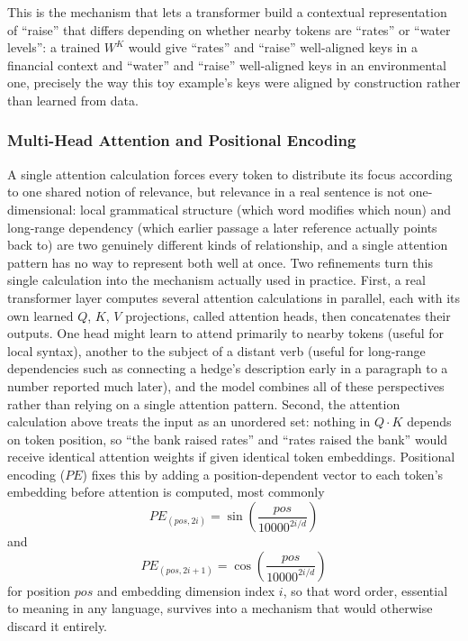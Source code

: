 \documentclass[../ai_in_finance]{subfiles}
\begin{document}
This is the mechanism that lets a transformer build a contextual representation of ``raise'' that differs depending on whether nearby tokens are ``rates'' or ``water levels'': a trained $W^K$ would give ``rates'' and ``raise'' well-aligned keys in a financial context and ``water'' and ``raise'' well-aligned keys in an environmental one, precisely the way this toy example's keys were aligned by construction rather than learned from data.

\subsubsection*{Multi-Head Attention and Positional Encoding}

A single attention calculation forces every token to distribute its focus according to one shared notion of relevance, but relevance in a real sentence is not one-dimensional: local grammatical structure (which word modifies which noun) and long-range dependency (which earlier passage a later reference actually points back to) are two genuinely different kinds of relationship, and a single attention pattern has no way to represent both well at once. Two refinements turn this single calculation into the mechanism actually used in practice. First, a real transformer layer computes several
attention calculations in parallel, each with its own learned $Q$, $K$, $V$ projections, called attention heads, then concatenates their outputs.
One head might learn to attend primarily to nearby tokens (useful for local syntax), another to the subject of a distant
verb (useful for long-range dependencies such as connecting a hedge's description early in a paragraph to a number reported much later),
and the model combines all of these perspectives rather than relying on a single attention pattern. Second, the attention calculation above
treats the input as an unordered set: nothing in $Q \cdot K$ depends on token position, so ``the bank raised rates'' and ``rates
raised the bank'' would receive identical attention weights if given identical token embeddings. Positional encoding ($PE$) fixes this by
adding a position-dependent vector to each token's embedding before attention is computed, most commonly
$$PE_{(pos, 2i)} = \sin\left(\frac{pos}{10000^{2i/d}}\right)$$
and
$$PE_{(pos,2i+1)} = \cos\left(\frac{pos}{10000^{2i/d}}\right)$$
for position $pos$ and embedding dimension index $i$, so that word order, essential to meaning in any language, survives into a mechanism that would otherwise discard it entirely.
\end{document}
